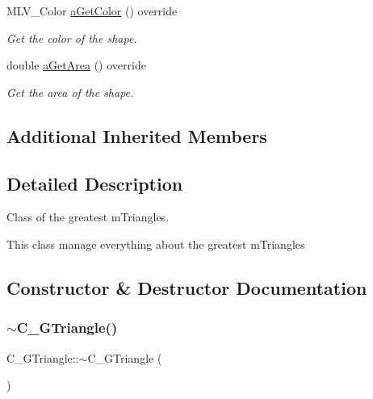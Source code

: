 \begin{DoxyCompactItemize}
M\+L\+V\+\_\+\+Color \hyperlink{classC__GTriangle_a19100d603f9239fd66f1115c4358f0fc}{a\+Get\+Color} () override
\begin{DoxyCompactList}\small\item\em Get the color of the shape. \end{DoxyCompactList}\item 
double \hyperlink{classC__GTriangle_a4d1c9a050aef86a7eab973b1fe668544}{a\+Get\+Area} () override
\begin{DoxyCompactList}\small\item\em Get the area of the shape. \end{DoxyCompactList}\end{DoxyCompactItemize}
\subsection*{Additional Inherited Members}


\subsection{Detailed Description}
Class of the greatest m\+Triangles. 

This class manage everything about the greatest m\+Triangles 

\subsection{Constructor \& Destructor Documentation}
\mbox{\label{classC__GTriangle_ad904f86d6bde64caabd005b3bad333e2}} 
\subsubsection{\texorpdfstring{$\sim$\+C\+\_\+\+G\+Triangle()}{~C\_GTriangle()}\hspace{0.1cm}{\footnotesize\ttfamily [1/2]}}
{\footnotesize\ttfamily C\+\_\+\+G\+Triangle\+::$\sim$\+C\+\_\+\+G\+Triangle (\begin{DoxyParamCaption}{ }\end{DoxyParamCaption})\hspace{0.3cm}{\ttfamily [override]}}



